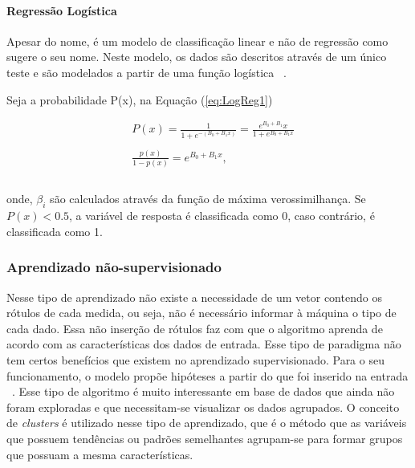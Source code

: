         \paragraph{Regressão Logística}
        \label{par:reglog}

          Apesar do nome, é um modelo de classificação linear e não de regressão como sugere o seu nome. Neste modelo, os dados
          são descritos através de um único teste e são modelados a partir de uma função logística ~\cite{nasrabadi2007pattern}.

          Seja a probabilidade P(x), na Equação (\ref{eq:LogReg1})


          \begin{equation}\label{eq:LogReg1}
            \begin{aligned}
              & P(x) = \frac{1}{1+e^{-(B_{0}+B_{1}x)}} = \frac{e^{B_{0} + B_{1}}x}{1+e^{B_{0}+B_{1}x} }\\ \\
              & \frac{p(x)}{1-p(x)} = e^{B_{0}+B_{1}x},\\ \\
          \end{aligned} 
          \end{equation}
         
          onde, $\beta_{i}$ são calculados através da função de máxima verossimilhança. Se $P(x)< 0.5$, a variável de resposta é classificada como 0, caso contrário, é classificada como 1.

    \subsubsection{Aprendizado não-supervisionado}

          Nesse tipo de aprendizado não existe a necessidade de um vetor contendo os rótulos de cada medida, ou seja, não é 
          necessário informar à máquina o tipo de cada dado. Essa não inserção de rótulos faz com que o algoritmo aprenda de acordo 
          com as características dos dados de entrada. Esse tipo de paradigma não tem certos benefícios que existem  no aprendizado supervisionado. 
          Para o seu funcionamento, o modelo propõe hipóteses a partir do que foi inserido na entrada ~\cite{bonaccorso2017machine}. Esse tipo de algoritmo 
          é muito interessante em base de dados que ainda não foram exploradas e que necessitam-se visualizar os dados agrupados. O conceito de \textit{clusters}
          é utilizado nesse tipo de aprendizado, que é o método que as variáveis que possuem tendências ou padrões semelhantes agrupam-se para formar grupos
          que possuam a mesma características.  

